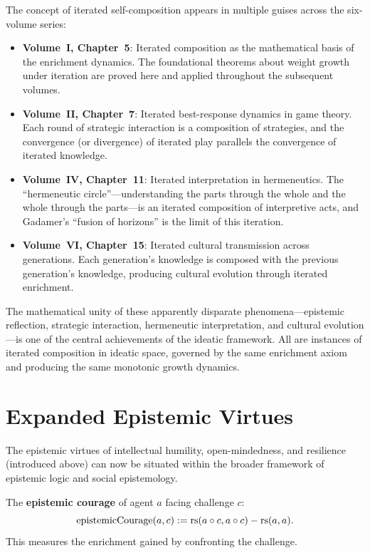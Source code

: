 \begin{remark}
The concept of iterated self-composition appears in multiple guises across the
six-volume series:

\begin{itemize}
\item \textbf{Volume~I, Chapter~5}: Iterated composition as the mathematical
  basis of the enrichment dynamics. The foundational theorems about weight growth
  under iteration are proved here and applied throughout the subsequent volumes.
\item \textbf{Volume~II, Chapter~7}: Iterated best-response dynamics in game
  theory. Each round of strategic interaction is a composition of strategies,
  and the convergence (or divergence) of iterated play parallels the convergence
  of iterated knowledge.
\item \textbf{Volume~IV, Chapter~11}: Iterated interpretation in hermeneutics.
  The ``hermeneutic circle''---understanding the parts through the whole and the
  whole through the parts---is an iterated composition of interpretive acts, and
  Gadamer's ``fusion of horizons'' is the limit of this iteration.
\item \textbf{Volume~VI, Chapter~15}: Iterated cultural transmission across
  generations. Each generation's knowledge is composed with the previous
  generation's knowledge, producing cultural evolution through iterated enrichment.
\end{itemize}

The mathematical unity of these apparently disparate phenomena---epistemic
reflection, strategic interaction, hermeneutic interpretation, and cultural
evolution---is one of the central achievements of the ideatic framework. All
are instances of iterated composition in ideatic space, governed by the same
enrichment axiom and producing the same monotonic growth dynamics.
\end{remark}

\section{Expanded Epistemic Virtues}

The epistemic virtues of intellectual humility, open-mindedness, and resilience
(introduced above) can now be situated within the broader framework of epistemic
logic and social epistemology.

\begin{definition}
\label{def:epistemic-courage}
The \textbf{epistemic courage} of agent $a$ facing challenge $c$:
\[
  \mathrm{epistemicCourage}(a, c) := \mathrm{rs}(a \circ c, a \circ c) - \mathrm{rs}(a, a).
\]
This measures the enrichment gained by confronting the challenge.
\end{definition}


